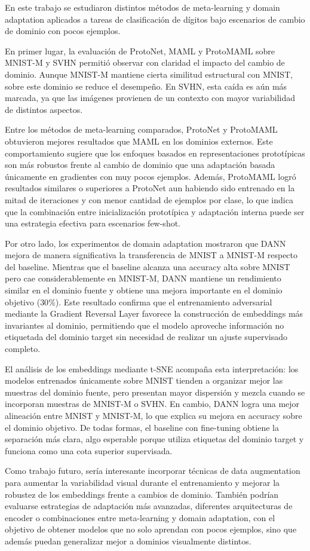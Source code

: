 En este trabajo se estudiaron distintos métodos de meta-learning y domain adaptation aplicados a tareas de clasificación de dígitos bajo escenarios de cambio de dominio con pocos ejemplos.

En primer lugar, la evaluación de ProtoNet, MAML y ProtoMAML sobre MNIST-M y SVHN permitió observar con claridad el impacto del cambio de dominio. Aunque MNIST-M mantiene cierta similitud estructural con MNIST, sobre este dominio se reduce el desempeño. En SVHN, esta caída es aún más marcada, ya que las imágenes provienen de un contexto con mayor variabilidad de distintos aspectos. 

Entre los métodos de meta-learning comparados, ProtoNet y ProtoMAML obtuvieron mejores resultados que MAML en los dominios externos. Este comportamiento sugiere que los enfoques basados en representaciones prototípicas son más robustos frente al cambio de dominio que una adaptación basada únicamente en gradientes con muy pocos ejemplos. Además, ProtoMAML logró resultados similares o superiores a ProtoNet aun habiendo sido entrenado en la mitad de iteraciones y con menor cantidad de ejemplos por clase, lo que indica que la combinación entre inicialización prototípica y adaptación interna puede ser una estrategia efectiva para escenarios few-shot.

Por otro lado, los experimentos de domain adaptation mostraron que DANN mejora de manera significativa la transferencia de MNIST a MNIST-M respecto del baseline. Mientras que el baseline alcanza una accuracy alta sobre MNIST pero cae considerablemente en MNIST-M, DANN mantiene un rendimiento similar en el dominio fuente y obtiene una mejora importante en el dominio objetivo ($30\%$). Este resultado confirma que el entrenamiento adversarial mediante la Gradient Reversal Layer favorece la construcción de embeddings más invariantes al dominio, permitiendo que el modelo aproveche información no etiquetada del dominio target sin necesidad de realizar un ajuste supervisado completo.

El análisis de los embeddings mediante t-SNE acompaña esta interpretación: los modelos entrenados únicamente sobre MNIST tienden a organizar mejor las muestras del dominio fuente, pero presentan mayor dispersión y mezcla cuando se incorporan muestras de MNIST-M o SVHN. En cambio, DANN logra una mejor alineación entre MNIST y MNIST-M, lo que explica su mejora en accuracy sobre el dominio objetivo. De todas formas, el baseline con fine-tuning obtiene la separación más clara, algo esperable porque utiliza etiquetas del dominio target y funciona como una cota superior supervisada.

Como trabajo futuro, sería interesante incorporar técnicas de data augmentation para aumentar la variabilidad visual durante el entrenamiento y mejorar la robustez de los embeddings frente a cambios de dominio. También podrían evaluarse estrategias de adaptación más avanzadas, diferentes arquitecturas de encoder o combinaciones entre meta-learning y domain adaptation, con el objetivo de obtener modelos que no solo aprendan con pocos ejemplos, sino que además puedan generalizar mejor a dominios visualmente distintos.